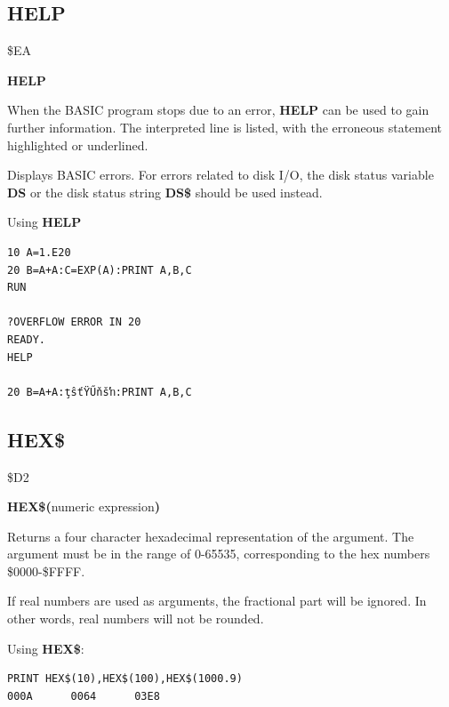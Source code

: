 
\newpage
\subsection{HELP}
\begin{description}[leftmargin=2cm,style=nextline]
\item [Token:] \$EA
\item [Format:] {\bf HELP}
\item [Usage:]
   When the BASIC program stops due to an error,
   {\bf HELP} can be used to gain further information.
   The interpreted line is listed, with the
   erroneous statement highlighted or underlined.

\item [Remarks:]
      Displays BASIC errors. For errors related to disk
      I/O, the disk status variable {\bf DS}
      or the disk status string {\bf DS\$} should be used instead.

\item [Example:] Using {\bf HELP}
\begin{tcolorbox}[colback=black,coltext=white]
\verbatimfont{\codefont}
\begin{verbatim}
10 A=1.E20
20 B=A+A:C=EXP(A):PRINT A,B,C
RUN

?OVERFLOW ERROR IN 20
READY.
HELP

20 B=A+A:ţŝťŸŰňšŉ:PRINT A,B,C
\end{verbatim}
\end{tcolorbox}
\end{description}


\newpage
\subsection{HEX\$}
\begin{description}[leftmargin=2cm,style=nextline]
\item [Token:] \$D2
\item [Format:] {\bf HEX\$(}numeric expression{\bf)}
\item [Usage:] Returns a four character hexadecimal
               representation of the argument.
               The argument must be in the range of 0-65535,
               corresponding to the hex numbers \$0000-\$FFFF.

\item [Remarks:] If real numbers are used as arguments, the
                 fractional part will be ignored. In other words, real numbers
                 will not be rounded.

\item [Example:] Using {\bf HEX\$}:
\begin{tcolorbox}[colback=black,coltext=white]
\verbatimfont{\codefont}
\begin{verbatim}
PRINT HEX$(10),HEX$(100),HEX$(1000.9)
000A      0064      03E8
\end{verbatim}
\end{tcolorbox}
\end{description}

